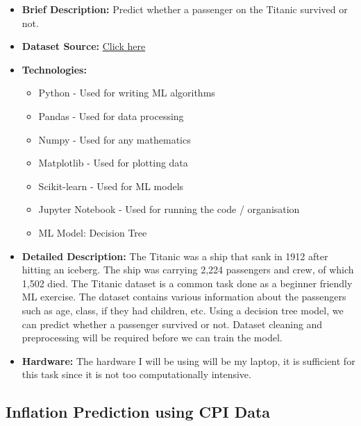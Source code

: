 \documentclass{article}
\begin{document}
\begin{itemize}
    \item \textbf{Brief Description:} Predict whether a passenger on the Titanic survived or not.
    \item \textbf{Dataset Source:} \href{https://web.stanford.edu/class/archive/cs/cs109/cs109.1166/problem12.html}{Click here}
    \item \textbf{Technologies:}
    \begin{itemize}
        \item Python - Used for writing ML algorithms
        \item Pandas - Used for data processing
        \item Numpy - Used for any mathematics
        \item Matplotlib - Used for plotting data
        \item Scikit-learn - Used for ML models
        \item Jupyter Notebook - Used for running the code / organisation
        \item ML Model: Decision Tree
    \end{itemize}
    \item \textbf{Detailed Description:} The Titanic was a ship that sank in 1912 after hitting an iceberg. The ship was carrying 2,224 passengers and crew, of which 1,502 died. 
    The Titanic dataset is a common task done as a beginner friendly ML exercise. The dataset contains various information about the passengers such as age, class, if they had children, etc.
    Using a decision tree model, we can predict whether a passenger survived or not. Dataset cleaning and preprocessing will be required before we can train the model.
    \item \textbf{Hardware:} The hardware I will be using will be my laptop, it is sufficient for this task since it is not too computationally intensive.
\end{itemize}

\subsection{Inflation Prediction using CPI Data}
\end{document}
